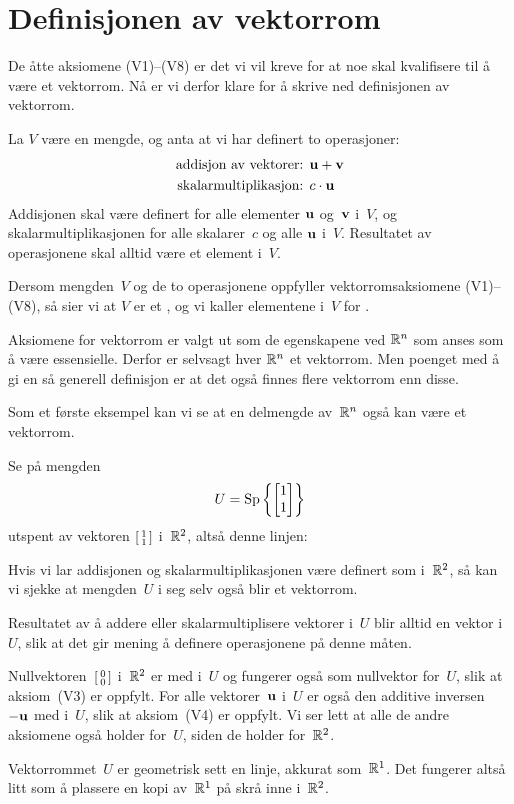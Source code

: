 
\section*{Definisjonen av vektorrom}

De åtte aksiomene (V1)--(V8) er det vi vil kreve for at noe skal
kvalifisere til å være et vektorrom.  Nå er vi derfor klare for å
skrive ned definisjonen av vektorrom.

\begin{defn}
La $V$ være en mengde, og anta at vi har definert to operasjoner:
\begin{align*}
\text{addisjon av vektorer: } & \mathbf{u} + \mathbf{v} \\
\text{skalarmultiplikasjon: } & c \cdot \mathbf{u}
\end{align*}
Addisjonen skal være definert for alle elementer $\mathbf{u}$ og~$\mathbf{v}$
i~$V$, og skalarmultiplikasjonen for alle skalarer~$c$ og alle $\mathbf{u}$
i~$V$.  Resultatet av operasjonene skal alltid være et element i~$V$.

Dersom mengden~$V$ og de to operasjonene oppfyller vektorromsaksiomene
(V1)--(V8), så sier vi at $V$ er et , og vi kaller
elementene i~$V$ for .
\end{defn}

Aksiomene for vektorrom er valgt ut som de egenskapene ved $\mathbb{R}^n$ som
anses som å være essensielle.  Derfor er selvsagt hver $\mathbb{R}^n$ et
vektorrom.  Men poenget med å gi en så generell definisjon er at det
også finnes flere vektorrom enn disse.

Som et første eksempel kan vi se at en delmengde av~$\mathbb{R}^n$ også kan
være et vektorrom.

\begin{ex}
\label{ex:underrom1}
Se på mengden
\[
U = \operatorname{Sp} \left\{ \begin{bmatrix} 1 \\ 1 \end{bmatrix} \right\}
\]
utspent av vektoren $\left[ \begin{smallmatrix} 1 \\ 1 \end{smallmatrix} \right]$ i~$\mathbb{R}^2$, altså denne linjen:
\begin{center}
\end{center}
Hvis vi lar addisjonen og skalarmultiplikasjonen være definert som
i~$\mathbb{R}^2$, så kan vi sjekke at mengden~$U$ i seg selv også blir et
vektorrom.

Resultatet av å addere eller skalarmultiplisere vektorer i~$U$ blir
alltid en vektor i~$U$, slik at det gir mening å definere operasjonene
på denne måten.

Nullvektoren~$\left[ \begin{smallmatrix} 0 \\ 0 \end{smallmatrix} \right]$ i~$\mathbb{R}^2$ er med i~$U$ og fungerer også som
nullvektor for~$U$, slik at aksiom~(V3) er oppfylt.  For alle
vektorer~$\mathbf{u}$ i~$U$ er også den additive inversen~$-\mathbf{u}$ med i~$U$,
slik at aksiom~(V4) er oppfylt.  Vi ser lett at alle de andre
aksiomene også holder for~$U$, siden de holder for~$\mathbb{R}^2$.

Vektorrommet~$U$ er geometrisk sett en linje, akkurat som~$\mathbb{R}^1$.  Det
fungerer altså litt som å plassere en kopi av~$\mathbb{R}^1$ på skrå inne
i~$\mathbb{R}^2$.
\end{ex}


